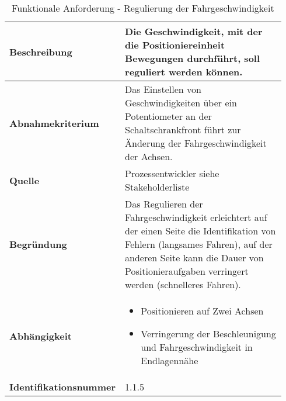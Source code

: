 \documentclass[../Bachelorarbeit.tex]{subfiles}
\begin{document}
\begin{table}[H]
    \centering
    \begin{tabular}{| p{0.34\linewidth} | p{0.6\linewidth} |}
        \hline
        \textbf{Beschreibung} & Die Geschwindigkeit, mit der die Positioniereinheit Bewegungen durchführt, soll reguliert werden können. \\ \hline
        \textbf{Abnahmekriterium} & Das Einstellen von Geschwindigkeiten über ein Potentiometer an der Schaltschrankfront führt zur Änderung der Fahrgeschwindigkeit der Achsen. \\ \hline
        \textbf{Quelle} & Prozessentwickler siehe Stakeholderliste \\ \hline
        \textbf{Begründung} & Das Regulieren der Fahrgeschwindigkeit erleichtert auf der einen Seite die Identifikation von Fehlern (langsames Fahren), auf der anderen Seite kann die Dauer von Positionieraufgaben verringert werden (schnelleres Fahren). \\ \hline
        \textbf{Abhängigkeit} & {\begin{itemize}[noitemsep,topsep=0pt,parsep=0pt,partopsep=0pt,leftmargin=*]
            \item Positionieren auf Zwei Achsen
            \item Verringerung der Beschleunigung und Fahrgeschwindigkeit in Endlagennähe
        \end{itemize}} \\ \hline
        \textbf{Identifikationsnummer} & 1.1.5 \\ \hline
    \end{tabular}
    \caption[\acs{fa} - Regulierung der Fahrgeschwindigkeit]{Funktionale Anforderung - Regulierung der Fahrgeschwindigkeit}
    \label{tab:my-table5}
\end{table}
\end{document}
